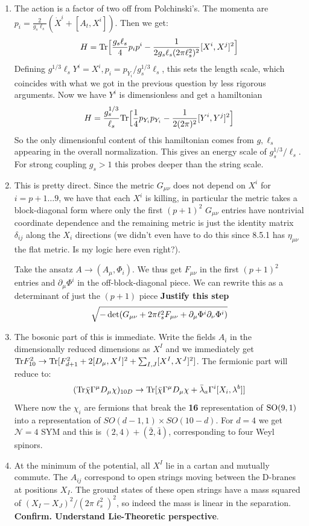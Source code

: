 \documentclass[11pt, class=article, crop=false]{standalone}
\begin{document}
\begin{enumerate}
	\item The action is a factor of two off from Polchinski's. The momenta are $p_i = \frac{2}{g_s \ell_s} (\dot X^i + [A_t, X^i])$. Then we get:
	\[
		H = \mathrm{Tr}\Big[\frac{g_s \ell_s}{4} p_i p^i - \frac{1}{2 g_s \ell_s (2\pi \ell_s^2)^2} [X^i, X^j]^2\Big]
	\]
	Defining $g^{1/3} \ell_s Y^i = X^i, p_i = p_{Y_i}/g_s^{1/3} \ell_s$, this sets the length scale, which coincides with what we got in the previous question by less rigorous arguments. Now we have $Y^i$ is dimensionless and get a hamiltonian
	\[
		H = \frac{g_s^{1/3}}{\ell_s} \mathrm{Tr}\Big[\frac14 p_{Y_i} p_{Y_i} - \frac{1}{2 (2\pi )^2} [Y^i, Y^j]^2\Big]
	\]
	So the only dimensionful content of this hamiltonian comes from $g, \ell_s$ appearing in the overall normalization. This gives an energy scale of $g_s^{1/3}/\ell_s$. For strong coupling $g_s > 1$ this probes deeper than the string scale. 
	
	\item This is pretty direct. Since the metric $G_{\mu \nu}$ does not depend on $X^i$ for $i=p+1 \dots 9$, we have that each $X^i$ is killing, in particular the metric takes a block-diagonal form where only the first $(p+1)^2$ $G_{\mu \nu}$ entries have nontrivial coordinate dependence and the remaining metric is just the identity matrix $\delta_{ij}$ along the $X_i$ directions (we didn't even have to do this since 8.5.1 has $\eta_{\mu \nu}$ the flat metric. Is my logic here even right?). 
	
	Take the ansatz $A \to (A_\mu, \Phi_i)$. We thus get $F_{\mu \nu}$ in the first $(p+1)^2$ entries and $\partial_\mu \Phi^i$ in the off-block-diagonal piece. We can rewrite this as a determinant of just the $(p+1)$ piece \textbf{Justify this step}
	\[
		\sqrt{-\det(G_{\mu \nu} + 2 \pi \ell_s^2 F_{\mu \nu} + \partial_\mu \Phi^i \partial_\nu \Phi^i)}
	\]
	
	\item The bosonic part of this is immediate. Write the fields $A_i$ in the dimensionally reduced dimensions as $X^I$ and we immediately get $\mathrm{Tr} F^2_{10} \to \mathrm{Tr} [F_{d+1}^2 + 2 [D_\mu, X^I]^2 + \sum_{I, J} [X^I, X^J]^2]$. The fermionic part will reduce to:
	\[
		(\mathrm{Tr} \bar \chi \Gamma^\mu D_\mu \chi)_{10D} \to \mathrm{Tr} [\bar \chi \Gamma^\mu D_\mu \chi + \bar \lambda_a \Gamma^{i} [X_i , \lambda^b] ] 
	\] 
	Where now the $\chi_i$ are fermions that break the \textbf{16} representation of $\mathrm{SO}(9,1)$ into a representation of $SO(d-1, 1) \times SO(10-d)$. For $d = 4$ we get $\mathcal N = 4$ SYM and this is $(2, 4) + (\bar 2, \bar 4)$, corresponding to four Weyl spinors. 
	\item At the minimum of the potential, all $X^I$ lie in a cartan and mutually commute. The $A_{ij}$ correspond to open strings moving between the D-branes at positions $X_I$. The ground states of these open strings have a mass squared of $(X_I - X_J)^2/(2 \pi \ell_s^2)^2$, so indeed the mass is linear in the separation. \textbf{Confirm. Understand Lie-Theoretic perspective}.
	

\end{enumerate}
\end{document}
